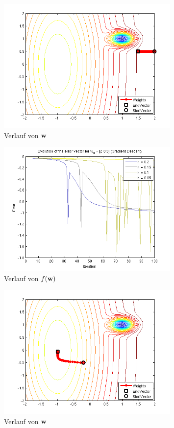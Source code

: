 \begin{figure}[h!]
  \centering
  \includegraphics[width=0.8\textwidth]{./figures/211/path_w01_eta005.png}
  \caption{Verlauf von $\mathbf{w}$}
  \label{fig:211_path_w01_eta005}
\end{figure}

\begin{figure}[h!]
  \centering
  \includegraphics[width=0.8\textwidth]{./figures/211/error_w01.png}
  \caption{Verlauf von $f(\mathbf{w})$}
  \label{fig:211_error_w01}
\end{figure}

\begin{figure}[h!]
  \centering
  \includegraphics[width=0.8\textwidth]{./figures/211/path_w02_eta02.png}
  \caption{Verlauf von $\mathbf{w}$}
  \label{fig:211_path_w02_eta02}
\end{figure}

